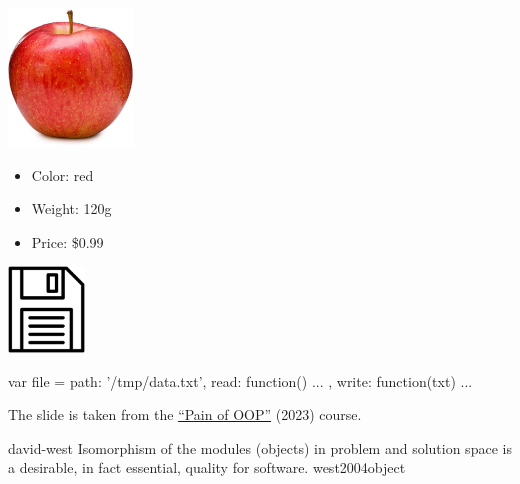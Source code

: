 \documentclass{article}
\begin{document}
\begin{multicols}{2}
\includegraphics[width=1.3in]{apple.jpg}
\begin{itemize}\setlength\itemsep{0em}
\item Color: red
\item Weight: 120g
\item Price: \$0.99
\end{itemize}
\par\columnbreak\par
\includegraphics[width=0.8in]{file-on-disc.jpg}
\par
{\small\begin{ffcode}
var file = {
  path: '/tmp/data.txt',
  read: function() { ... },
  write: function(txt) { ... }
}
\end{ffcode}
}
\end{multicols}
\par
{\scriptsize The slide is taken from the \href{https://github.com/yegor256/painofoop}{``Pain of OOP''} (2023) course.\par}
\plush{}

\lnQuote
  {david-west}
  {Isomorphism of the modules (objects) in problem and solution space is a desirable, in fact essential, quality for software.}
  {west2004object}
\end{document}
